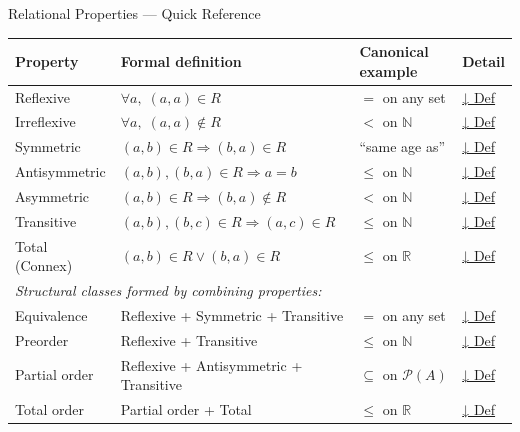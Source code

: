 \begin{toolkitbox}{Relational Properties — Quick Reference}
\small
\begin{tabular}{l l l l}
\toprule
\textbf{Property} & \textbf{Formal definition} & \textbf{Canonical example} & \textbf{Detail} \\
\midrule
Reflexive      & $\forall a,\; (a,a)\in R$                           & $=$ on any set      & \hyperref[def:reflexive]{↓ Def} \\
Irreflexive    & $\forall a,\; (a,a)\notin R$                        & $<$ on $\mathbb{N}$ & \hyperref[def:irreflexive]{↓ Def} \\
Symmetric      & $(a,b)\in R \Rightarrow (b,a)\in R$                 & ``same age as''     & \hyperref[def:symmetric]{↓ Def} \\
Antisymmetric  & $(a,b),(b,a)\in R \Rightarrow a=b$                  & $\leq$ on $\mathbb{N}$ & \hyperref[def:antisymmetric]{↓ Def} \\
Asymmetric     & $(a,b)\in R \Rightarrow (b,a)\notin R$              & $<$ on $\mathbb{N}$ & \hyperref[def:asymmetric]{↓ Def} \\
Transitive     & $(a,b),(b,c)\in R \Rightarrow (a,c)\in R$           & $\leq$ on $\mathbb{N}$ & \hyperref[def:transitive]{↓ Def} \\
Total (Connex) & $(a,b)\in R \lor (b,a)\in R$                        & $\leq$ on $\mathbb{R}$ & \hyperref[def:total-rel]{↓ Def} \\
\midrule
\multicolumn{4}{l}{\textit{Structural classes formed by combining properties:}} \\
\midrule
Equivalence    & Reflexive + Symmetric + Transitive                  & $=$ on any set      & \hyperref[def:equivalence-rel]{↓ Def} \\
Preorder       & Reflexive + Transitive                              & $\leq$ on $\mathbb{N}$ & \hyperref[def:preorder]{↓ Def} \\
Partial order  & Reflexive + Antisymmetric + Transitive              & $\subseteq$ on $\mathcal{P}(A)$ & \hyperref[def:partial-order]{↓ Def} \\
Total order    & Partial order + Total                               & $\leq$ on $\mathbb{R}$ & \hyperref[def:total-order]{↓ Def} \\
\bottomrule
\end{tabular}
\end{toolkitbox}


